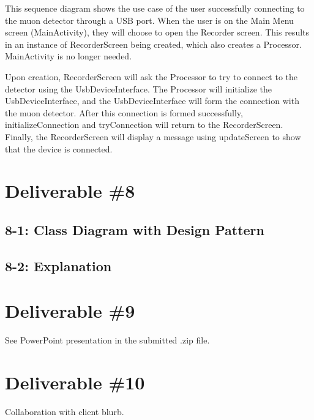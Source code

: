 \documentclass[11pt,a4paper]{article}
\begin{document}
This sequence diagram shows the use case of the user successfully connecting to the muon detector through a USB port. When the user is on the Main Menu screen (MainActivity), they will choose to open the Recorder screen. This results in an instance of RecorderScreen being created, which also creates a Processor. MainActivity is no longer needed. 

Upon creation, RecorderScreen will ask the Processor to try to connect to the detector using the UsbDeviceInterface. The Processor will initialize the UsbDeviceInterface, and the UsbDeviceInterface will form the connection with the muon detector. After this connection is formed successfully, initializeConnection and tryConnection will return to the RecorderScreen. Finally, the RecorderScreen will display a message using updateScreen to show that the device is connected.



\newpage
\section*{Deliverable \#8}

\subsection*{8-1: Class Diagram with Design Pattern}



\subsection*{8-2: Explanation}





\section*{Deliverable \#9}

See PowerPoint presentation in the submitted .zip file.


\section*{Deliverable \#10}

Collaboration with client blurb.
\end{document}

